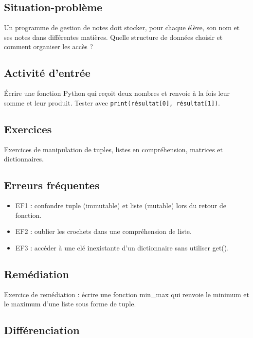 \subsection{Situation-problème}

Un programme de gestion de notes doit stocker, pour chaque élève, son
nom et ses notes dans différentes matières. Quelle structure de données
choisir et comment organiser les accès ?

\subsection{Activité d’entrée}

Écrire une fonction Python qui reçoit deux nombres et renvoie à la fois
leur somme et leur produit. Tester avec \lstinline|print(résultat[0], résultat[1])|.

\subsection{Exercices}

Exercices de manipulation de tuples, listes en compréhension, matrices
et dictionnaires.

\subsection{Erreurs fréquentes}

\begin{itemize}
\tightlist
\item
  EF1 : confondre tuple (immutable) et liste (mutable) lors du retour de
  fonction.
\item
  EF2 : oublier les crochets dans une compréhension de liste.
\item
  EF3 : accéder à une clé inexistante d'un dictionnaire sans utiliser
  get().
\end{itemize}

\subsection{Remédiation}

Exercice de remédiation : écrire une fonction min\_max qui renvoie le
minimum et le maximum d'une liste sous forme de tuple.

\subsection{Différenciation}

